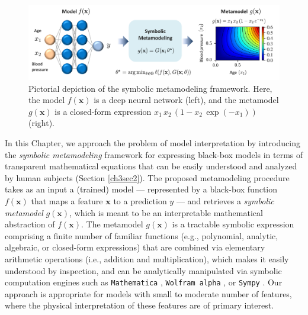 \documentclass [PhD] {uclathes}
\begin{document}
\begin{figure}[t]
\centering
\includegraphics[width=6in]{ch3Fig1.pdf}
\caption{Pictorial depiction of the symbolic metamodeling framework. Here, the model $f(\boldsymbol{x})$ is a deep neural network (left), and the metamodel $g(\boldsymbol{x})$ is a closed-form expression $x_1\,x_2\,(1-x_2\,\exp(-x_1))$ (right).}
\label{ch3fig1} 
\end{figure}

In this Chapter, we approach the problem of model interpretation by introducing the \textit{symbolic metamodeling} framework for expressing black-box models in terms of transparent mathematical equations that can be easily understood and analyzed by human subjects (Section \ref{ch3sec2}). The proposed metamodeling procedure takes as an input a (trained) model --- represented by a black-box function $f(\boldsymbol{x})$ that maps a feature $\boldsymbol{x}$ to a prediction $y$ --- and retrieves a \textit{symbolic metamodel} $g(\boldsymbol{x})$, which is meant to be an interpretable mathematical abstraction of $f(\boldsymbol{x})$. The metamodel $g(\boldsymbol{x})$ is a tractable symbolic expression comprising a finite number of familiar functions (e.g., polynomial, analytic, algebraic, or closed-form expressions) that are combined via elementary arithmetic operations (i.e., addition and multiplication), which makes it easily understood by inspection, and can be analytically manipulated via symbolic computation engines such as {\small \texttt{Mathematica}} \cite{abell2017mathematica}, {\small \texttt{Wolfram alpha}} \cite{wolfram2013wolfram}, or {\small \texttt{Sympy}} \cite{10.7717/peerj-cs.103}. Our approach is appropriate for models with small to moderate number of features, where the physical interpretation of these features are of primary interest. 
\end{document}
